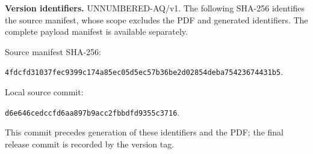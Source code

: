 \par\bigskip\begingroup\footnotesize
\noindent\textbf{Version identifiers.} UNNUMBERED-AQ/v1. The following SHA-256 identifies the source manifest, whose scope excludes the PDF and generated identifiers. The complete payload manifest is available separately.\par
\noindent Source manifest SHA-256:\par\noindent\texttt{4fdcfd31037fec93\allowbreak{}99c174a85ec05d5e\allowbreak{}c57b36be2d02854d\allowbreak{}eba75423674431b5}.\par
\noindent Local source commit:\par\noindent\texttt{d6e646cedccfd6aa\allowbreak{}897b9acc2fbbdfd9\allowbreak{}355c3716}.\par
This commit precedes generation of these identifiers and the PDF; the final release commit is recorded by the version tag.\par\endgroup
